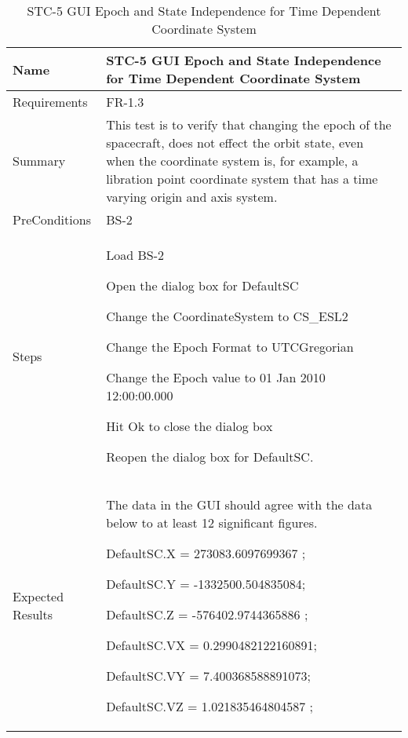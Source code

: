 \begin{table}[htbp!]
\centering
      \begin{tabular}{|p{1.05 in} |p{4.75 in} |}
      \hline
         \rowcolor[rgb]{0.8,0.8,0.8} Name & STC-5 GUI Epoch and State Independence for Time Dependent Coordinate System\\
         \hline
         Requirements & FR-1.3\\  \hline
         Summary &
         This test is to verify that changing the epoch of the spacecraft, does not effect
         the orbit state, even when the coordinate system is, for example, a libration point
         coordinate system that has a time varying origin and axis system.
         \\     \hline
         PreConditions & BS-2\\
         \hline
         Steps &
         \begin{compactenum}
              \item Load BS-2
              \item Open the dialog box for DefaultSC
              \item Change the CoordinateSystem to CS\_ESL2
              \item Change the Epoch Format to UTCGregorian
              \item Change the Epoch value to 01 Jan 2010 12:00:00.000
              \item Hit Ok to close the dialog box
              \item Reopen the dialog box for DefaultSC.
         \end{compactenum}
         \\\hline
         Expected Results &  The data in the GUI should agree with the data below to at least 12 significant figures.
         \begin{compactitem}
         \item DefaultSC.X =  273083.6097699367 ;
         \item DefaultSC.Y = -1332500.504835084;
         \item DefaultSC.Z = -576402.9744365886 ;
         \item DefaultSC.VX = 0.2990482122160891;
         \item DefaultSC.VY = 7.400368588891073;
         \item DefaultSC.VZ = 1.021835464804587 ;
                   
         \end{compactitem}\\
      \hline
\end{tabular}
      \label{Table: STC-5}
      \caption{STC-5 GUI Epoch and State Independence for Time Dependent Coordinate System}
\end{table} 